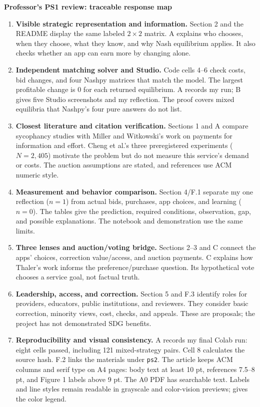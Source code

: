 \noindent\textbf{Professor's PS1 review: traceable response map}\par
\begin{enumerate}[label=\arabic*.,leftmargin=*]
\item \textbf{Visible strategic representation and information.} Section 2 and the README display the same labeled $2\times2$ matrix. A explains who chooses, when they choose, what they know, and why Nash equilibrium applies. It also checks whether an app can earn more by changing alone.
\item \textbf{Independent matching solver and Studio.} Code cells 4--6 check costs, bid changes, and four Nashpy matrices that match the model. The largest profitable change is 0 for each returned equilibrium. A records my run; B gives five Studio screenshots and my reflection. The proof covers mixed equilibria that Nashpy's four pure answers do not list.
\item \textbf{Closest literature and citation verification.} Sections 1 and A compare sycophancy studies with Miller and Witkowski's work on payments for information and effort. Cheng et al.'s three preregistered experiments ($N=2{,}405$) motivate the problem but do not measure this service's demand or costs. The auction assumptions are stated, and references use ACM numeric style.
\item \textbf{Measurement and behavior comparison.} Section 4/F.1 separate my one reflection ($n=1$) from actual bids, purchases, app choices, and learning ($n=0$). The tables give the prediction, required conditions, observation, gap, and possible explanations. The notebook and demonstration use the same limits.
\item \textbf{Three lenses and auction/voting bridge.} Sections 2--3 and C connect the apps' choices, correction value/access, and auction payments. C explains how Thaler's work informs the preference/purchase question. Its hypothetical vote chooses a service goal, not factual truth.
\item \textbf{Leadership, access, and correction.} Section 5 and F.3 identify roles for providers, educators, public institutions, and reviewers. They consider basic correction, minority views, cost, checks, and appeals. These are proposals; the project has not demonstrated SDG benefits.
\item \textbf{Reproducibility and visual consistency.} A records my final Colab run: eight cells passed, including 121 mixed-strategy pairs. Cell 8 calculates the source hash. F.2 links the materials under \texttt{ps2}. The article keeps ACM columns and serif type on A4 pages: body text at least 10 pt, references 7.5--8 pt, and Figure 1 labels above 9 pt. The A0 PDF has searchable text. Labels and line styles remain readable in grayscale and color-vision previews;  gives the color legend.
\end{enumerate}

